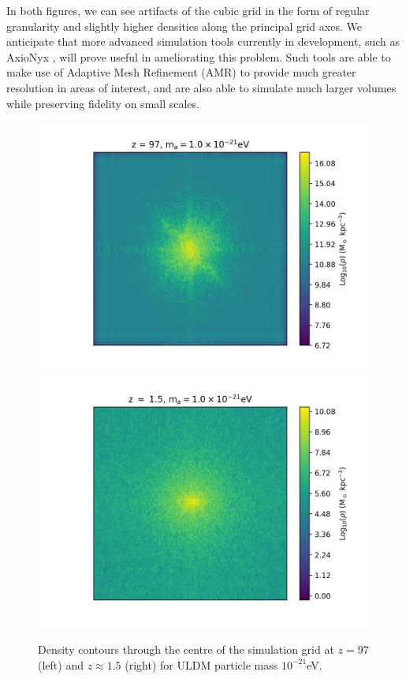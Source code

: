 \documentclass[a4paper,11pt]{article}
\begin{document}
In both figures, we can see artifacts of the cubic grid in the form of regular granularity and slightly higher densities along the principal grid axes. We anticipate that more advanced simulation tools currently in development, such as {\sc AxioNyx} \cite{Schwabe:2020eac}, will prove useful in ameliorating this problem. Such tools are able to make use of Adaptive Mesh Refinement (AMR) to provide much greater resolution in areas of interest, and are also able to simulate much larger volumes while preserving fidelity on small scales.


\begin{figure}[!htb]
  \includegraphics[trim={3cm 0 0 0}, scale=0.62]{z97_1e-21.png}
\endminipage\hfill
{}
  \includegraphics[trim={2cm 0 1cm 0},scale=0.62]{final_21.png}
\endminipage\hfill
\caption{Density contours through the centre of the simulation grid at $z=97$ (left) and $z\approx 1.5$ (right) for ULDM particle mass $10^{-21}$eV.}\label{fig:contours_21}
\end{figure}
\end{document}
